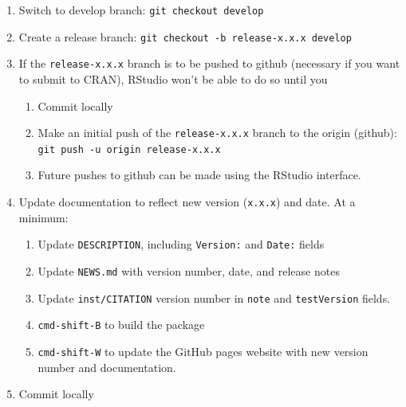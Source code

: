 \documentclass{article}
\begin{document}
\begin{enumerate}

  \item Switch to develop branch: \texttt{git checkout develop}

  \item Create a release branch: \texttt{git checkout -b release-x.x.x develop} 

  \item If the \texttt{release-x.x.x} branch is to be pushed to github
        (necessary if you want to submit to CRAN), 
        RStudio won't be able to do so until you
  \begin{enumerate}

    \item Commit locally

    \item Make an initial push of the \texttt{release-x.x.x} branch
	      to the origin (github): 
		  \texttt{git push -u origin release-x.x.x} 
	
	\item Future pushes to github can be made using the RStudio interface.

  \end{enumerate}
  \item Update documentation to reflect new version (\texttt{x.x.x}) and date.
        At a minimum:
  \begin{enumerate}

    \item Update \texttt{DESCRIPTION}, including \texttt{Version:} and \texttt{Date:} fields 
	
    \item Update \texttt{NEWS.md} with version number, date, and release notes
    
	\item Update \texttt{inst/CITATION} version number 
	      in \texttt{note} and \texttt{testVersion} fields.

    \item \texttt{cmd-shift-B} to build the package
	
	\item \texttt{cmd-shift-W} to update the GitHub pages website 
	      with new version number and documentation.

  \end{enumerate}
  \item Commit locally

\end{enumerate}
\end{document}
